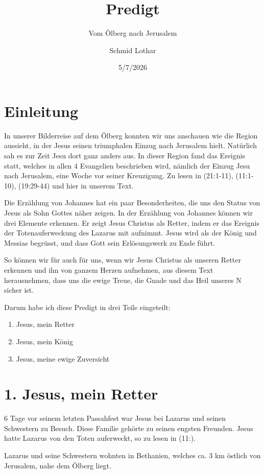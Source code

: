 \documentclass[fontsize=16pt]{mybib}
\title{Predigt}
\subtitle{Vom Ölberg nach Jerusalem}
\author{Schmid Lothar}
\date{5/7/2026}
\begin{document}
    \mytitlepage

    \tableofcontents
    \section{Einleitung}
    In unserer Bilderreise auf dem Ölberg konnten wir uns anschauen wie die Region aussieht, in der Jesus seinen triumphalen Einzug nach Jerusalem hielt. Natürlich sah es zur Zeit Jesu dort ganz anders aus.
    In dieser Region fand das Ereignis statt, welches in allen 4 Evangelien beschrieben wird, nämlich der Einzug Jesu nach Jerusalem, eine Woche vor seiner Kreuzigung. Zu lesen in (21:1-11), (11:1-10), (19:29-44) und hier in unserem Text.

    Die Erzählung von Johannes hat ein paar Besonderheiten, die uns den Status von Jesus als Sohn Gottes näher zeigen.
    In der Erzählung von Johannes können wir drei Elemente erkennen. Er zeigt Jesus Christus als Retter, indem er das Ereignis der Totenauferweckung des Lazarus mit aufnimmt. Jesus wird als der König und Messias begrüsst, und dass Gott sein Erlösungswerk zu Ende führt.

    So können wir für auch für uns, wenn wir Jesus Christus als unseren Retter erkennen und ihn von ganzem Herzen aufnehmen, aus diesem Text herausnehmen, dass uns die ewige Treue, die Gnade und das Heil unseres \herr N sicher ist.
    
    Darum habe ich diese Predigt in drei Teile eingeteilt:
    \begin{enumerate}
        \item Jesus, mein Retter
        \item Jesus, mein König
        \item Jesus, meine ewige Zuversicht
    \end{enumerate}

    \section{1. Jesus, mein Retter}
    6 Tage vor seinem letzten Passahfest war Jesus bei Lazarus und seinen Schwestern zu Besuch. Diese Familie gehörte zu seinen engsten Freunden. Jesus hatte Lazarus von den Toten auferweckt, so zu lesen in (11:).
    
    Lazarus und seine Schwestern wohnten in Bethanien, welches ca. 3 km östlich von Jerusalem, nahe dem Ölberg liegt.
    
\end{document}
